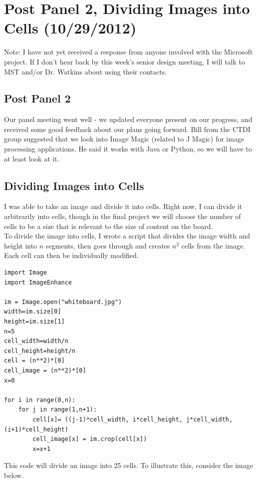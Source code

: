 \documentclass[]{article}
\begin{document}
	\section{Post Panel 2, Dividing Images into Cells (10/29/2012)}
	Note:  I have not yet received a response from anyone involved with the Microsoft project.  If I don't hear back by this week's senior design meeting, I will talk to MST and/or Dr. Watkins about using their contacts.
		\subsection*{Post Panel 2}
	Our panel meeting went well - we updated everyone present on our progress, and received some good feedback about our plans going forward.  Bill from the CTDI group suggested that we look into Image Magic (related to J Magic) for image processing applications.  He said it works with Java or Python, so we will have to at least look at it.  
		\subsection*{Dividing Images into Cells}
	I was able to take an image and divide it into cells.  Right now, I can divide it arbitrarily into  cells, though in the final project we will choose the number of cells to be a size that is relevant to the size of content on the board.  \\
	To divide the image into cells, I wrote a script that divides the image width and height into $n$ segments, then goes through and creates $n^2$ cells from the image.  Each cell can then be individually modified.
	
\begin{verbatim}
import Image
import ImageEnhance

im = Image.open("whiteboard.jpg")
width=im.size[0]
height=im.size[1]
n=5
cell_width=width/n
cell_height=height/n
cell = (n**2)*[0]
cell_image = (n**2)*[0]
x=0

for i in range(0,n):
    for j in range(1,n+1):
        cell[x]= ((j-1)*cell_width, i*cell_height, j*cell_width, (i+1)*cell_height)
        cell_image[x] = im.crop(cell[x])
        x=x+1
\end{verbatim}
	
This code will divide an image into 25 cells.  To illustrate this, consider the image below.
\end{document}
